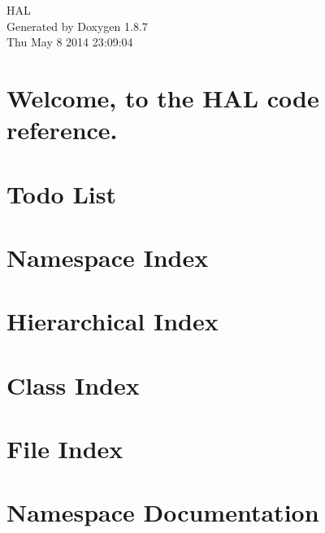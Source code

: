 \documentclass[twoside]{book}
\newcommand{\+}{\discretionary{\mbox{\scriptsize$\hookleftarrow$}}{}{}}
\newcommand{\clearemptydoublepage}{%
  \newpage{\pagestyle{empty}\cleardoublepage}%
}
\begin{document}
\hypersetup{pageanchor=false,
             bookmarks=true,
             bookmarksnumbered=true,
             pdfencoding=unicode
            }
\begin{titlepage}
\vspace*{7cm}
\begin{center}%
{\Large H\+A\+L }\\
\vspace*{1cm}
{\large Generated by Doxygen 1.8.7}\\
\vspace*{0.5cm}
{\small Thu May 8 2014 23:09:04}\\
\end{center}
\end{titlepage}
\clearemptydoublepage
\tableofcontents
\clearemptydoublepage
{}
\hypersetup{pageanchor=true}

\chapter{Welcome, to the H\+A\+L code reference.}
\label{index}\hypertarget{index}{}
\chapter{Todo List}
\label{todo}
\hypertarget{todo}{}

\chapter{Namespace Index}

\chapter{Hierarchical Index}

\chapter{Class Index}

\chapter{File Index}

\chapter{Namespace Documentation}

\end{document}
